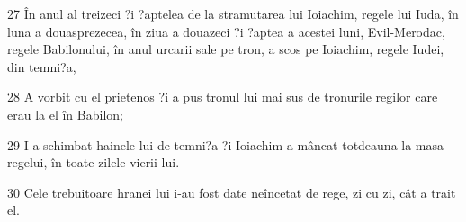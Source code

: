 \par 27 În anul al treizeci ?i ?aptelea de la stramutarea lui Ioiachim, regele lui Iuda, în luna a douasprezecea, în ziua a douazeci ?i ?aptea a acestei luni, Evil-Merodac, regele Babilonului, în anul urcarii sale pe tron, a scos pe Ioiachim, regele Iudei, din temni?a,
\par 28 A vorbit cu el prietenos ?i a pus tronul lui mai sus de tronurile regilor care erau la el în Babilon;
\par 29 I-a schimbat hainele lui de temni?a ?i Ioiachim a mâncat totdeauna la masa regelui, în toate zilele vierii lui.
\par 30 Cele trebuitoare hranei lui i-au fost date neîncetat de rege, zi cu zi, cât a trait el.


